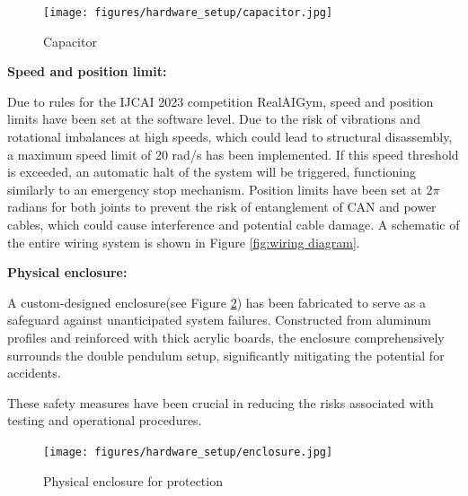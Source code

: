 \begin{figure}[H]
    \centering
    \texttt{[image: figures/hardware\_setup/capacitor.jpg]}
    \caption{Capacitor}
    \label{fig:capacitor}
\end{figure}

\textbf{Speed and position limit:}

Due to rules for the IJCAI 2023 competition RealAIGym\cite{dfki_ric_underactuated_lab_2023}, speed and position limits have been set at the software level. Due to the risk of vibrations and rotational imbalances at high speeds, which could lead to structural disassembly, a maximum speed limit of 20 rad/s has been implemented. If this speed threshold is exceeded, an automatic halt of the system will be triggered, functioning similarly to an emergency stop mechanism. Position limits have been set at \(2\pi\) radians for both joints to prevent the risk of entanglement of CAN and power cables, which could cause interference and potential cable damage. A schematic of the entire wiring system is shown in Figure \ref{fig:wiring diagram}.

\textbf{Physical enclosure:}

A custom-designed enclosure(see Figure \ref{fig:overview_experiment_setup}) has been fabricated to serve as a safeguard against unanticipated system failures. Constructed from aluminum profiles and reinforced with thick acrylic boards, the enclosure comprehensively surrounds the double pendulum setup, significantly mitigating the potential for accidents.

These safety measures have been crucial in reducing the risks associated with testing and operational procedures.

\begin{figure}[H]
    \centering
    \texttt{[image: figures/hardware\_setup/enclosure.jpg]}
    \caption{Physical enclosure for protection}
    \label{fig:overview_experiment_setup}
\end{figure}

